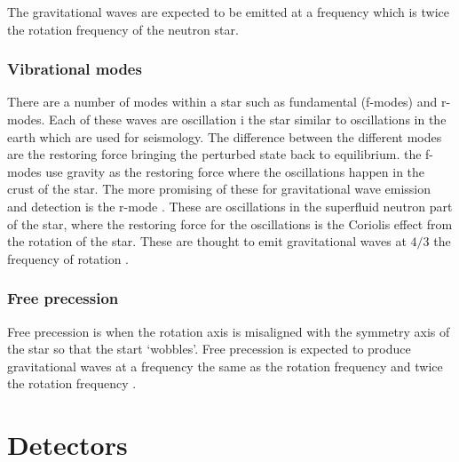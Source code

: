 The gravitational waves are expected to be emitted at a frequency which is twice the rotation frequency of the neutron star.
 
 \subsubsection{Vibrational modes}
There are a number of modes within a star such as fundamental (f-modes) and r-modes. 
Each of these waves are oscillation i the star similar to oscillations in the earth which are used for seismology.
The difference between the different modes are the restoring force bringing the perturbed state back to equilibrium.
the f-modes use gravity as the restoring force where the oscillations happen in the crust of the star.
The more promising of these for gravitational wave emission and detection is the r-mode \citep{Becker2009}.
These are oscillations in the superfluid neutron part of the star,
where the restoring force for the oscillations is the Coriolis effect from the rotation of the star.
These are thought to emit gravitational waves at $4/3$ the frequency of rotation \citep{Becker2009}.

\subsubsection{Free precession}

Free precession is when the rotation axis is misaligned with the symmetry axis of the star so that the start `wobbles'. 
Free precession is expected to produce gravitational waves at a frequency the same as the rotation frequency and twice the rotation frequency \citep{Becker2009}. 


\section{\label{intro:detector}Detectors}

